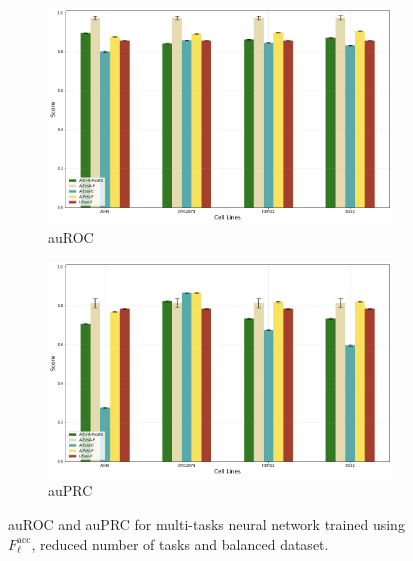 \begin{figure}[!htbp]
    \centering
    \begin{subfigure}[b]{\textwidth}
        \includegraphics[width=\textwidth]{images/results_plots/4celllines_auroc.png}
        \caption{auROC}
        \label{fig:auroc_4celllines}
    \end{subfigure}
    \begin{subfigure}[b]{\textwidth}
        \includegraphics[width=\textwidth]{images/results_plots/4celllines_auprc.png}
        \caption{auPRC}
        \label{fig:auprc_4celllines}
    \end{subfigure}
    \caption{auROC and auPRC for multi-tasks neural network trained using $F_\ell^{\textrm{acc}}$, reduced number of tasks and balanced dataset.}
    \label{fig:4celllines_results}
\end{figure}

